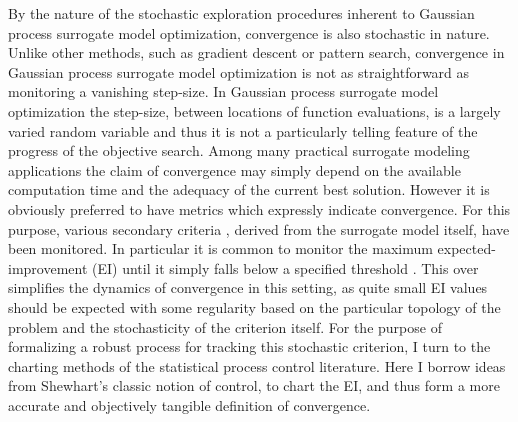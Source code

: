 \documentclass[12pt]{article}
\begin{document}
	
	By the nature of the stochastic exploration procedures inherent to Gaussian process surrogate model optimization, convergence is also stochastic in nature. 
	Unlike other methods, such as gradient descent or pattern search, convergence in Gaussian process surrogate model optimization is not as straightforward as monitoring a vanishing step-size.
	In Gaussian process surrogate model optimization the step-size, between locations of function evaluations, is a largely varied random variable and thus it is not a particularly telling feature of the progress of the objective search.
	Among many practical surrogate modeling applications the claim of convergence may simply depend on the available computation time and the adequacy of the current best solution.
	However it is obviously preferred to have metrics which expressly indicate convergence.
	For this purpose, various secondary criteria \cite{gramacy2014}, derived from the surrogate model itself, have been monitored.
	In particular it is common to monitor the maximum expected-improvement (EI) until it simply falls below a specified threshold \cite{windExample}.
	This over simplifies the dynamics of convergence in this setting, as quite small EI values should be expected with some regularity based on the particular topology of the problem and the stochasticity of the criterion itself. 
	For the purpose of formalizing a robust process for tracking this stochastic criterion, I turn to the charting methods of the statistical process control literature.
	Here I borrow ideas from Shewhart's \cite{shewhartBook} classic notion of control, to chart the EI, and thus form a more accurate and objectively tangible definition of convergence.  

	
\end{document}
